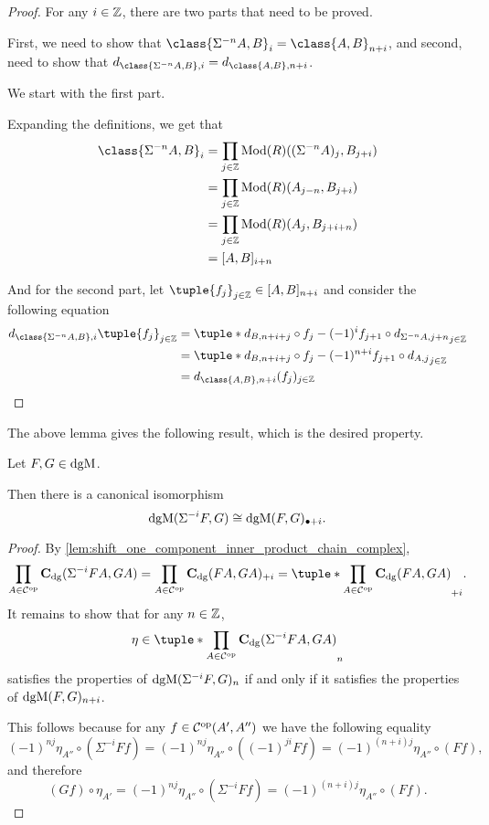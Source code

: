 \begin{proof}
    For any \( i \in {\mathbb{Z}} \), there are two parts that need to be proved.

    First, we need to show that \( \class{\Sigma^{-n} A, B}_i = \class{A, B}_{n + i} \), and second, need to show that \( d_{\class{\Sigma^{-n} A, B}, i} = d_{\class{A, B}, n + i} \).

    We start with the first part.

    Expanding the definitions, we get that
    \begin{align*}
        \class{\Sigma^{-n} A, B}_i &= \prod_{j \in \Zb} \Mod(R)((\Sigma^{-n} A)_j, B_{j + i}) \\
        &= \prod_{j \in \Zb} \Mod(R)(A_{j - n}, B_{j + i}) \\
        &= \prod_{j \in \Zb} \Mod(R)(A_j, B_{j + i + n}) \\
        &= [A, B]_{i + n}
    \end{align*}

    And for the second part, let \( \tuple{f_j}_{j \in \Zb} \in [A, B]_{n + i} \) and consider the following equation
    \begin{align*}
        d_{\class{\Sigma^{-n} A, B}, i}\tuple{f_j}_{j \in \Zb} &= \tuple*{d_{B, n + i + j} \circ f_j - (-1)^i f_{j + 1} \circ d_{\Sigma^{-n} A, j + n}}_{j \in \Zb} \\
        &= \tuple*{d_{B, n + i + j} \circ f_j - (-1)^{n + i} f_{j + 1} \circ d_{A, j}}_{j \in \Zb} \\
        &= d_{\class{A, B}, n + i}(f_j)_{j \in \Zb}
    \end{align*}
\end{proof}

The above lemma gives the following result, which is the desired property. 

\begin{lemma}
    \label{lem:dgmod_shift_eq_plus}
    Let \( F, G \in \operatorname{dgM} \).

    Then there is a canonical isomorphism
    \[
        \operatorname{dgM}(\Sigma^{-i} F, G) \cong \operatorname{dgM}(F, G)_{\bullet + i}.
    \]
\end{lemma}
\begin{proof}
    By \autoref{lem:shift_one_component_inner_product_chain_complex},
    \[
        \prod_{A \in \Cc^{\op}} \C_{\dg}(\Sigma^{-i} F A, G A) = \prod_{A \in \Cc^{\op}} \C_{\dg}(F A, G A)_{+i} = \tuple*{\prod_{A \in \Cc^{\op}} \C_{\dg}(F A, G A)}_{+i}.
    \]
    It remains to show that for any \( n \in {\mathbb{Z}} \),
    \[
        \eta \in \tuple*{\prod_{A \in \Cc^{\op}} \C_{\dg}(\Sigma^{-i} F A, G A)}_n
    \]
    satisfies the properties of \( \operatorname{dgM}(\Sigma^{-i} F, G)_n \) if and only if it satisfies the properties of \( \operatorname{dgM}(F, G)_{n + i} \).

    This follows because for any \( f \in {\mathcal{C}}^{\operatorname{op}}(A', A'') \) we have the following equality
    \[
        (-1)^{nj} \eta_{A''} \circ (\Sigma^{-i} F f) = (-1)^{nj} \eta_{A''} \circ ((-1)^{ji}F f) = (-1)^{(n + i)j}\eta_{A''} \circ (F f),
    \]
    and therefore
    \[
        (G f) \circ \eta_{A'} = (-1)^{nj} \eta_{A''} \circ (\Sigma^{-i} F f) = (-1)^{(n + i)j}\eta_{A''} \circ (F f).
    \]
\end{proof}

